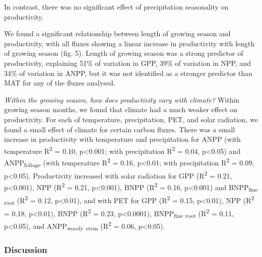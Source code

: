 \documentclass[]{article}
\begin{document}
In contrast, there was no significant effect of precipitation
seasonality on productivity.

We found a significant relationship between length of growing season and
productivity, with all fluxes showing a linear increase in productivity
with length of growing season (fig. 5). Length of growing season was a
strong predictor of productivity, explaining 51\% of variation in GPP,
39\% of variation in NPP, and 34\% of variation in ANPP, but it was not
identified as a stronger predictor than MAT for any of the fluxes
analysed.

\emph{Within the growing season, how does productivity vary with
climate?} Within growing season months, we found that climate had a much
weaker effect on productivity. For each of temperature, precipitation,
PET, and solar radiation, we found a small effect of climate for certain
carbon fluxes. There was a small increase in productivity with
temperature and precipitation for ANPP (with temperature
R\textsuperscript{2} = 0.10, p\textless{}0.001; with precipitation
R\textsuperscript{2} = 0.04, p\textless{}0.05) and
ANPP\textsubscript{foliage} (with temperature R\textsuperscript{2} =
0.16, p\textless{}0.01; with precipitation R\textsuperscript{2} = 0.09,
p\textless{}0.05). Productivity increased with solar radiation for GPP
(R\textsuperscript{2} = 0.21, p\textless{}0.001), NPP
(R\textsuperscript{2} = 0.21, p\textless{}0.001), BNPP
(R\textsuperscript{2} = 0.16, p\textless{}0.001) and
BNPP\textsubscript{fine} \textsubscript{root} (R\textsuperscript{2} =
0.12, p\textless{}0.01), and with PET for GPP (R\textsuperscript{2} =
0.15, p\textless{}0.01), NPP (R\textsuperscript{2} = 0.18,
p\textless{}0.01), BNPP (R\textsuperscript{2} = 0.23,
p\textless{}0.0001), BNPP\textsubscript{fine} \textsubscript{root}
(R\textsuperscript{2} = 0.11, p\textless{}0.05), and
ANPP\textsubscript{woody} \textsubscript{stem} (R\textsuperscript{2} =
0.06, p\textless{}0.05).

\subsubsection{Discussion}\label{discussion}
\end{document}
